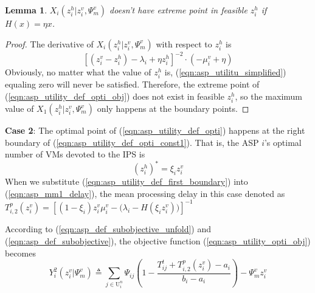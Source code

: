 \documentclass[conference]{IEEEtran}
\newtheorem{lemma}{Lemma}
\begin{document}
\begin{lemma} \label{lemma:asp_case1_not_exist}
$X_i(z_i^h|z_i^v,\Psi_m^v)$ doesn't have extreme point in feasible $z_i^h$ if $H(x) = \eta{x}$. 
\end{lemma}



\begin{proof}
The derivative of $X_i(z_i^h|z_i^v,\Psi_m^v)$ with respect to $z_i^h$ is
\begin{equation} \label{eqn:asp_utilitu_simplified}
[(z_i^v - z_i^h) - \lambda_i + \eta{z_i^h}]^{-2} \cdot (-\mu_i^v + \eta)
\end{equation}
Obviously, no matter what the value of $z_i^h$ is, (\ref{eqn:asp_utilitu_simplified}) equaling zero will never be satisfied. Therefore, the extreme point of (\ref{eqn:asp_utility_def_opti_obj}) does not exist in feasible $z_i^h$, so the maximum value of $X_1(z_i^h|z_i^v,\Psi_m^v)$ only happens at the boundary points.
\qedhere
\end{proof}


\textbf{Case 2}: The optimal point of (\ref{eqn:asp_utility_def_opti}) happens at the right boundary of (\ref{eqn:asp_utility_def_opti_const1}). That is, the ASP $i$'s optimal number of VMs devoted to the IPS is
\begin{equation} \label{eqn:asp_utility_def_first_boundary}
(z_i^h)^* = \xi_i z_i^v
\end{equation}
When we substitute (\ref{eqn:asp_utility_def_first_boundary}) into (\ref{eqn:asp_mm1_delay}), the mean processing delay in this case denoted as $T_{i,2}^p(z_i^v) = [(1-\xi_i)z_i^v\mu_i^v - \big(\lambda_i - H(\xi_iz_i^v)\big)]^{-1}$

According to (\ref{eqn:asp_def_subobjective_unfold}) and (\ref{eqn:asp_def_subobjective}), the objective function (\ref{eqn:asp_utility_opti_obj}) becomes
\begin{equation} \label{eqn:asp_case2_objective}
Y_i^2(z_i^v|\Psi_m^v) \triangleq \sum_{j \in \mathrm{U}_i^n}\Psi_{ij}(1-\frac{T_{ij}^t + T_{i,2}^p(z_i^v)-a_i}{b_i-a_i}) - \Psi_m^vz_i^v
\end{equation}
\end{document}
